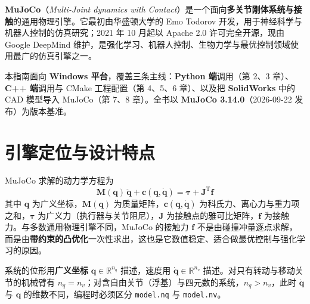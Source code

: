 
\textbf{MuJoCo}（\textit{Multi-Joint dynamics with Contact}）是一个面向\textbf{多关节刚体系统与接触}的通用物理引擎。它最初由华盛顿大学的 Emo Todorov 开发，用于神经科学与机器人控制的仿真研究；2021 年 10 月起以 Apache 2.0 许可完全开源，现由 Google DeepMind 维护，是强化学习、机器人控制、生物力学与最优控制领域使用最广的仿真引擎之一。

本指南面向 \textbf{Windows 平台}，覆盖三条主线：\textbf{Python 端}调用（第 2、3 章）、\textbf{C++ 端}调用与 CMake 工程配置（第 4、5、6 章）、以及把 \textbf{SolidWorks} 中的 CAD 模型导入 MuJoCo（第 7、8 章）。全书以 \textbf{MuJoCo 3.14.0}（2026-09-22 发布）为版本基准。

\section{引擎定位与设计特点}

MuJoCo 求解的动力学方程为
\begin{equation}
	\boldsymbol{M}(\boldsymbol{q})\,\ddot{\boldsymbol{q}}+\boldsymbol{c}(\boldsymbol{q},\dot{\boldsymbol{q}})
	=\boldsymbol{\tau}+\boldsymbol{J}^{\mathrm{T}}\boldsymbol{f}
	\label{eq:MuJoCo:运动方程}
\end{equation}
其中 $\boldsymbol{q}$ 为广义坐标，$\boldsymbol{M}(\boldsymbol{q})$ 为质量矩阵，$\boldsymbol{c}(\boldsymbol{q},\dot{\boldsymbol{q}})$ 为科氏力、离心力与重力项之和，$\boldsymbol{\tau}$ 为广义力（执行器与关节阻尼），$\boldsymbol{J}$ 为接触点的雅可比矩阵，$\boldsymbol{f}$ 为接触力。与多数通用物理引擎不同，MuJoCo 的接触力 $\boldsymbol{f}$ 不是由碰撞冲量逐点求解，而是由\textbf{带约束的凸优化}一次性求出，这也是它数值稳定、适合做最优控制与强化学习的原因。

\begin{definition}[广义坐标]
	系统的位形用\textbf{广义坐标} $\boldsymbol{q}\in\mathbb{R}^{n_{q}}$ 描述，速度用 $\dot{\boldsymbol{q}}\in\mathbb{R}^{n_{v}}$ 描述。对只有转动与移动关节的机械臂有 $n_{q}=n_{v}$；对含自由关节（浮基）与四元数的系统，$n_{q}>n_{v}$，此时 $\dot{\boldsymbol{q}}$ 与 $\boldsymbol{q}$ 的维数不同，编程时必须区分 \texttt{model.nq} 与 \texttt{model.nv}。
	\label{def:MuJoCo:广义坐标}
\end{definition}

